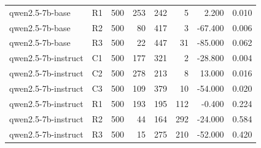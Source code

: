 \begin{table}
\begin{tabular}{llrrrrrr}
qwen2.5-7b-base & R1 & 500 & 253 & 242 & 5 & 2.200 & 0.010 \\
qwen2.5-7b-base & R2 & 500 & 80 & 417 & 3 & -67.400 & 0.006 \\
qwen2.5-7b-base & R3 & 500 & 22 & 447 & 31 & -85.000 & 0.062 \\
qwen2.5-7b-instruct & C1 & 500 & 177 & 321 & 2 & -28.800 & 0.004 \\
qwen2.5-7b-instruct & C2 & 500 & 278 & 213 & 8 & 13.000 & 0.016 \\
qwen2.5-7b-instruct & C3 & 500 & 109 & 379 & 10 & -54.000 & 0.020 \\
qwen2.5-7b-instruct & R1 & 500 & 193 & 195 & 112 & -0.400 & 0.224 \\
qwen2.5-7b-instruct & R2 & 500 & 44 & 164 & 292 & -24.000 & 0.584 \\
qwen2.5-7b-instruct & R3 & 500 & 15 & 275 & 210 & -52.000 & 0.420 \\
\bottomrule
\end{tabular}
\end{table}
